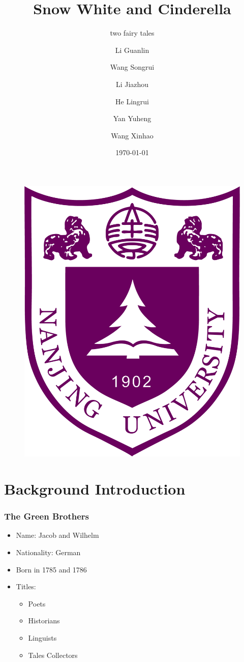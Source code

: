 \documentclass{beamer}
\title[Reflection on Snow White and Cinderella]
{Snow White and Cinderella}
\subtitle{two fairy tales}
\author[Eric, Richard] %
{Li Guanlin\inst{1} \and Wang Songrui\inst{1} \and Li Jiazhou\inst{1} \and He Lingrui\inst{1} \and Yan Yuheng\inst{1} \and Wang Xinhao\inst{1}}
\institute[NJU] %
{
    \inst{1}%
    Undeegraduate in ICS\\
    Nanjing University
}
\date[NJU 2023] %
{\today}
\begin{document}
\begin{frame}
    \titlepage
    \begin{figure}[htpb]
        \begin{center}
            \includegraphics[width=0.14\linewidth]{pic/NJU_Logo.png}
        \end{center}
    \end{figure}
\end{frame}

\begin{frame}
    \tableofcontents[sectionstyle=show,subsectionstyle=show/shaded/hide,subsubsectionstyle=show/shaded/hide]
\end{frame}

\section{Background Introduction}
\begin{frame}
    \frametitle{The Green Brothers}
    \begin{itemize}
        \item<1-> Name: Jacob and Wilhelm
        \item<2-> Nationality: German
        \item<3-> Born in 1785 and 1786\cite[baidu]{baidubaike}
        \item<4-> Titles:
            \begin{itemize}
                \item Poets
                \item Historians
                \item Linguists
                \item \alert{Tales Collectors}
            \end{itemize}
    \end{itemize}
\end{frame}
\end{document}

